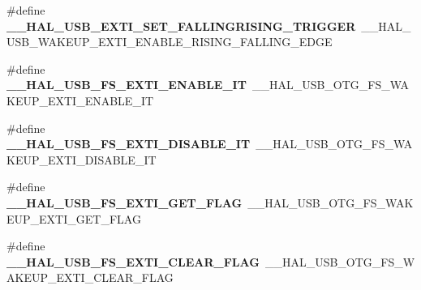 \begin{DoxyCompactItemize}
\item 
\hypertarget{group___h_a_l___u_s_b___aliased___macros_gab88741810e4ac8773680c0cc6b948e37}{\#define {\bfseries \-\_\-\-\_\-\-H\-A\-L\-\_\-\-U\-S\-B\-\_\-\-E\-X\-T\-I\-\_\-\-S\-E\-T\-\_\-\-F\-A\-L\-L\-I\-N\-G\-R\-I\-S\-I\-N\-G\-\_\-\-T\-R\-I\-G\-G\-E\-R}~\-\_\-\-\_\-\-H\-A\-L\-\_\-\-U\-S\-B\-\_\-\-W\-A\-K\-E\-U\-P\-\_\-\-E\-X\-T\-I\-\_\-\-E\-N\-A\-B\-L\-E\-\_\-\-R\-I\-S\-I\-N\-G\-\_\-\-F\-A\-L\-L\-I\-N\-G\-\_\-\-E\-D\-G\-E}\label{group___h_a_l___u_s_b___aliased___macros_gab88741810e4ac8773680c0cc6b948e37}

\item 
\hypertarget{group___h_a_l___u_s_b___aliased___macros_ga31a23737a111962f4231725129dcebde}{\#define {\bfseries \-\_\-\-\_\-\-H\-A\-L\-\_\-\-U\-S\-B\-\_\-\-F\-S\-\_\-\-E\-X\-T\-I\-\_\-\-E\-N\-A\-B\-L\-E\-\_\-\-I\-T}~\-\_\-\-\_\-\-H\-A\-L\-\_\-\-U\-S\-B\-\_\-\-O\-T\-G\-\_\-\-F\-S\-\_\-\-W\-A\-K\-E\-U\-P\-\_\-\-E\-X\-T\-I\-\_\-\-E\-N\-A\-B\-L\-E\-\_\-\-I\-T}\label{group___h_a_l___u_s_b___aliased___macros_ga31a23737a111962f4231725129dcebde}

\item 
\hypertarget{group___h_a_l___u_s_b___aliased___macros_gac7f83957a48d47ee7f44742dd7e30ff3}{\#define {\bfseries \-\_\-\-\_\-\-H\-A\-L\-\_\-\-U\-S\-B\-\_\-\-F\-S\-\_\-\-E\-X\-T\-I\-\_\-\-D\-I\-S\-A\-B\-L\-E\-\_\-\-I\-T}~\-\_\-\-\_\-\-H\-A\-L\-\_\-\-U\-S\-B\-\_\-\-O\-T\-G\-\_\-\-F\-S\-\_\-\-W\-A\-K\-E\-U\-P\-\_\-\-E\-X\-T\-I\-\_\-\-D\-I\-S\-A\-B\-L\-E\-\_\-\-I\-T}\label{group___h_a_l___u_s_b___aliased___macros_gac7f83957a48d47ee7f44742dd7e30ff3}

\item 
\hypertarget{group___h_a_l___u_s_b___aliased___macros_gabf961284ea86d34de9e320e6f04fa8af}{\#define {\bfseries \-\_\-\-\_\-\-H\-A\-L\-\_\-\-U\-S\-B\-\_\-\-F\-S\-\_\-\-E\-X\-T\-I\-\_\-\-G\-E\-T\-\_\-\-F\-L\-A\-G}~\-\_\-\-\_\-\-H\-A\-L\-\_\-\-U\-S\-B\-\_\-\-O\-T\-G\-\_\-\-F\-S\-\_\-\-W\-A\-K\-E\-U\-P\-\_\-\-E\-X\-T\-I\-\_\-\-G\-E\-T\-\_\-\-F\-L\-A\-G}\label{group___h_a_l___u_s_b___aliased___macros_gabf961284ea86d34de9e320e6f04fa8af}

\item 
\hypertarget{group___h_a_l___u_s_b___aliased___macros_ga50dabd1d5a2ad8d58e598a9faf24d812}{\#define {\bfseries \-\_\-\-\_\-\-H\-A\-L\-\_\-\-U\-S\-B\-\_\-\-F\-S\-\_\-\-E\-X\-T\-I\-\_\-\-C\-L\-E\-A\-R\-\_\-\-F\-L\-A\-G}~\-\_\-\-\_\-\-H\-A\-L\-\_\-\-U\-S\-B\-\_\-\-O\-T\-G\-\_\-\-F\-S\-\_\-\-W\-A\-K\-E\-U\-P\-\_\-\-E\-X\-T\-I\-\_\-\-C\-L\-E\-A\-R\-\_\-\-F\-L\-A\-G}\label{group___h_a_l___u_s_b___aliased___macros_ga50dabd1d5a2ad8d58e598a9faf24d812}


\end{DoxyCompactItemize}
